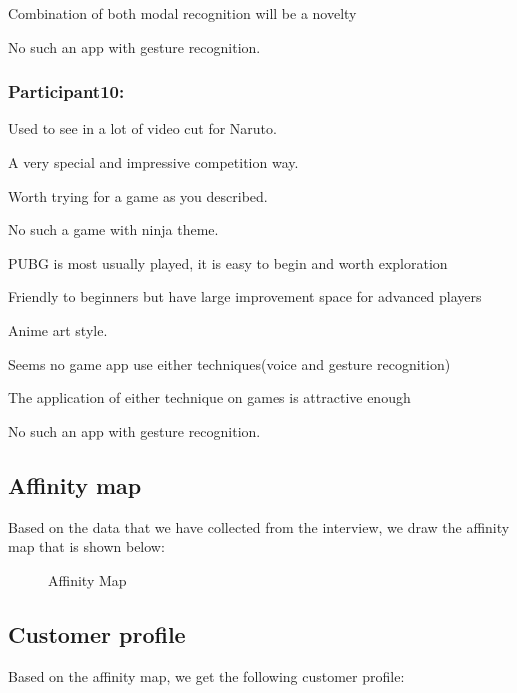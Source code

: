 \documentclass[UTF8,a4paper,12pt]{ctexart}
\numberwithin{equation}{section}
\begin{document}
Combination of both modal recognition will be a novelty

No such an app with gesture recognition.
\subsubsection*{Participant10:}
Used to see in a lot of video cut for Naruto.

A very special and impressive competition way.

Worth trying for a game as you described.

No such a game with ninja theme.

PUBG is most usually played, it is easy to begin and worth exploration

Friendly to beginners but have large improvement space for advanced players

Anime art style.

Seems no game app use either techniques(voice and gesture recognition)

The application of either technique on games is attractive enough

No such an app with gesture recognition.
\subsection{Affinity map}
Based on the data that we have collected from the interview, we draw the affinity map that is shown below:
\begin{figure}[htb] 
\caption{Affinity Map}
\end{figure}
\subsection{Customer profile}
Based on the affinity map, we get the following customer profile:
\end{document}
